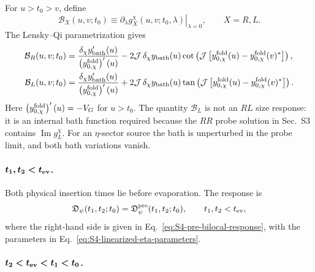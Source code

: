 \documentclass[11pt,a4paper]{article}
\begin{document}
For \(u>t_0>v\), define
\begin{equation}
  \mathcal B_X(u,v;t_0)
  \equiv
  \left.
  \partial_\lambda
  g^\chi_X(u,v;t_0,\lambda)
  \right|_{\lambda=0},
  \qquad
  X=R,L .
\label{eq:S4-bath-response-definition}
\end{equation}
The Lensky--Qi parametrization gives
\begin{equation}
\begin{aligned}
  \mathcal B_R(u,v;t_0)
  &=
  \frac{
  \delta_\chi y'_{\rm bath}(u)
  }{
  \left(y^{\rm fold}_{0,\chi}\right)'(u)
  }
  -
  2\mathcal J\,
  \delta_\chi y_{\rm bath}(u)
  \cot\left(
  \mathcal J
  \left[
  y^{\rm fold}_{0,\chi}(u)
  -
  y^{\rm fold}_{0,\chi}(v)^*
  \right]
  \right),
  \\
  \mathcal B_L(u,v;t_0)
  &=
  \frac{
  \delta_\chi y'_{\rm bath}(u)
  }{
  \left(y^{\rm fold}_{0,\chi}\right)'(u)
  }
  +
  2\mathcal J\,
  \delta_\chi y_{\rm bath}(u)
  \tan\left(
  \mathcal J
  \left[
  y^{\rm fold}_{0,\chi}(u)
  -
  y^{\rm fold}_{0,\chi}(v)^*
  \right]
  \right).
\end{aligned}
\label{eq:S4-bath-response-functions}
\end{equation}
Here
\(\left(y^{\rm fold}_{0,\chi}\right)'(u)=-V_G\) for \(u>t_0\).
The quantity \(\mathcal B_L\) is not an \(RL\) size response: it is an
internal bath function required because the \(RR\) probe solution in Sec.~S3
contains \(\operatorname{Im}g_L^\chi\). For an \(\eta\)-sector source the
bath is unperturbed in the probe limit, and both bath variations vanish.

\paragraph*{\(\boldsymbol{t_1,t_2<t_{\rm ev}}\).}

Both physical insertion times lie before evaporation. The response is
\begin{equation}
  \mathfrak D_\psi(t_1,t_2;t_0)
  =
  \mathfrak D^{\rm pre}_\psi(t_1,t_2;t_0),
  \qquad
  t_1,t_2<t_{\rm ev},
\label{eq:S4-bilocal-pre-region}
\end{equation}
where the right-hand side is given in
Eq.~\eqref{eq:S4-pre-bilocal-response}, with the parameters in
Eq.~\eqref{eq:S4-linearized-eta-parameters}.

\paragraph*{\(\boldsymbol{t_2<t_{\rm ev}<t_1<t_0}\).}
\end{document}
